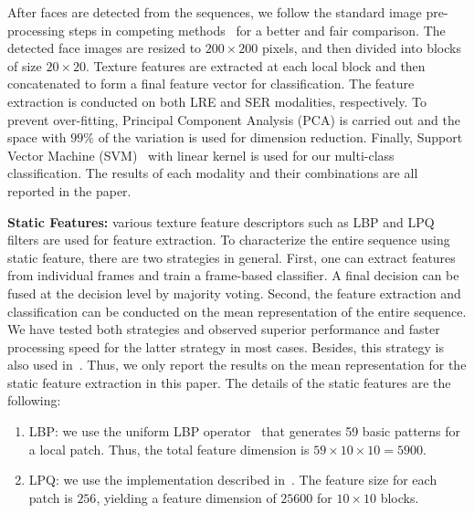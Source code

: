 \documentclass[journal]{IEEEtran}
\begin{document}
After faces are detected from the sequences, we follow the standard image pre-processing steps in competing methods~\cite{Valstar12,Yang_SMCB12} for a better and fair comparison. The detected face images are resized to $200\times200$ pixels, and then divided into blocks of size $20\times20$. Texture features are extracted at each local block and then concatenated to form a final feature vector for classification. The feature extraction is conducted on both LRE and SER modalities, respectively. To prevent over-fitting, Principal Component Analysis (PCA) is carried out and the space with $99\%$ of the variation is used for dimension reduction. Finally, Support Vector Machine (SVM)~\cite{libsvm} with linear kernel is used for our multi-class classification. The results of each modality and their combinations are all reported in the paper. 

\textbf{Static Features:} various texture feature descriptors such as LBP and LPQ filters are used for feature extraction. To characterize the entire sequence using static feature, there are two strategies in general. First, one can extract features from individual frames and train a frame-based classifier. A final decision can be fused at the decision level by majority voting. Second, the feature extraction and classification can be conducted on the mean representation of the entire sequence. We have tested both strategies and observed superior performance and faster processing speed for the latter strategy in most cases. Besides, this strategy is also used in~\cite{Yang_SMCB12}. Thus, we only report the results on the mean representation for the static feature extraction in this paper. The details of the static features are the following:
\begin{enumerate}
\item LBP: we use the uniform LBP operator~\cite{Ojala_PAMI02} that generates 59 basic patterns for a local patch. Thus, the total feature dimension is $59\times 10\times 10=5900$. 
\item LPQ: we use the implementation described in~\cite{LPQ}. The feature size for each patch is $256$, yielding a feature dimension of $25600$ for $10 \times 10$ blocks. 
\end{enumerate}
\end{document}
